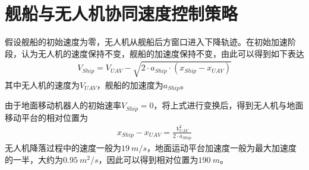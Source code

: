 %
%

\section{舰船与无人机协同速度控制策略}
假设舰船的初始速度为零，无人机从舰船后方窗口进入下降轨迹。在初始加速阶段，认为无人机的速度保持不变，舰船的加速度保持不变，由此可以得到如下表达
\begin{align}
V_{Ship} = V_{UAV} - \sqrt{2 \cdot a_{Ship} \cdot (x_{Ship} - x_{UAV})}
\end{align}
其中无人机的速度为$V_{UAV}$，舰船的加速度为$a_{Ship}$。

由于地面移动机器人的初始速率$V_{Ship}=0$，将上式进行变换后，得到无人机与地面移动平台的相对位置为
\begin{align}
x_{Ship}-x_{UAV} = \frac{V_{UAV}^2}{2 \cdot a_{Ship}}
\end{align}
无人机降落过程中的速度一般为$19\ m/s$，地面运动平台加速度一般为最大加速度的一半，大约为$0.95\ m^2/s$，因此可以得到相对位置为$190\ m$。

